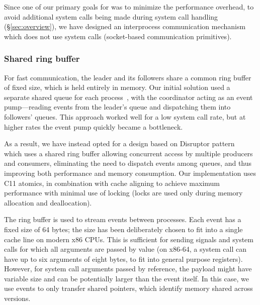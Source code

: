 Since one of our primary goals for \nx was to minimize the performance
overhead, to avoid additional system calls being made during system call
handling (\S\ref{sec:overview}), we have designed an interprocess communication
mechanism which does not use system calls (\eg socket-based communication
primitives).

\subsubsection{Shared ring buffer}
\label{sec:ring}

For fast communication, the leader and its followers share a common
ring buffer of fixed size, which is held entirely in memory.  Our
initial solution used a separate shared queue for each
process~\cite{fastforward,mcringbuffer}, with the
coordinator acting as an event pump---reading events from the leader's
queue and dispatching them into followers' queues.  This approach
worked well for a low system call rate, but at higher rates the event
pump quickly became a bottleneck.  

As a result, we have instead opted for a design based on Disruptor
pattern~\cite{disruptor} which uses a shared ring buffer allowing concurrent
access by multiple producers and consumers, eliminating the need to dispatch
events among queues, and thus improving both performance and memory
consumption.  Our implementation uses C11 atomics, 
in combination with cache aligning to
achieve maximum performance with minimal use of locking (locks are used only
during memory allocation and deallocation).

The ring buffer is used to stream events between processes. Each event
has a fixed size of 64 bytes; the size has been deliberately chosen to
fit into a single cache line on modern x86 CPUs.  This is sufficient
for sending signals and system calls for which all arguments are
passed by value (on x86-64, a system call can have up to six arguments
of eight bytes, to fit into general purpose registers).  However, for
system call arguments passed by reference, the payload might have
variable size and can be potentially larger than the event itself.  In
this case, we use events to only transfer shared pointers, which
identify memory shared across versions.


